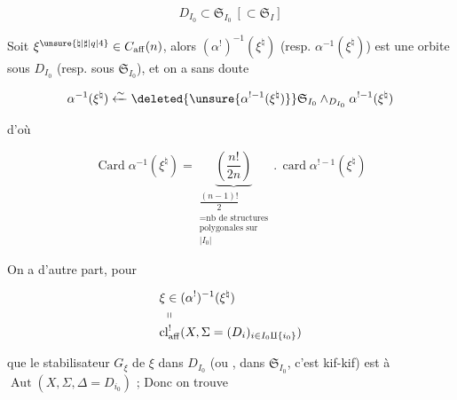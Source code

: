 
\[
D_{I_0}\subset\mathfrak S_{I_0}\ [\subset\mathfrak S_I]
\]



Soit $\xi^{\unsure{\natural|\sharp|q|4}}\in C_{\mathrm{aff}}(n)$, alors $(\alpha^!)^{-1}(\xi^\natural)$ (resp. $\alpha^{-1}(\xi^\natural)$) est une orbite sous $D_{I_0}$ (resp. sous $\mathfrak S_{I_0}$), et on a sans doute

\[
\alpha^{-1}(\xi^\natural)\xleftarrow{\sim}\deleted{\unsure{\alpha^{!-1}(\xi^\natural)}}\mathfrak S_{I_0}\mathbin{\wedge}_{D_{I_0}}\alpha^{!-1}(\xi^\natural)
\]

d'où

\[
\operatorname{Card}\alpha^{-1}(\xi^\natural)=
\underbrace{\left(\frac{n!}{2n}\right)}_{\substack{\dfrac{(n-1)!}{2}\\=\text{nb de structures}\\\text{polygonales sur}\\|I_0|}}
\mathbin{.}\operatorname{card}\alpha^{!-1}(\xi^\natural)
\]

On a d'autre part, pour

\[
\begin{aligned}
&\xi\in(\alpha^!)^{-1}(\xi^\natural)\\[-2pt]
&\ \shortparallel\\[-2pt]
&\mathrm{cl}^{!}_{\mathrm{aff}}(X,\Sigma=(D_i)_{i\in I_0\amalg\{i_0\}})
\end{aligned}
\]

que le stabilisateur $G_\xi$ de $\xi$ dans $D_{I_0}$ (ou , dans $\mathfrak S_{I_0}$, c'est kif-kif) est   à $\operatorname{Aut}(X,\Sigma,\Delta=D_{i_0})$ ; Donc on trouve
